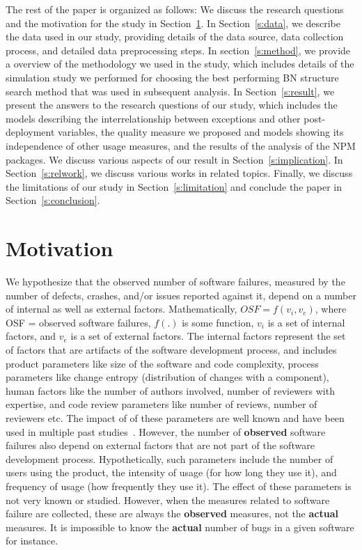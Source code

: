 \documentclass[smallcondensed]{svjour3}     %
\begin{document}
The rest of the paper is organized as follows: We discuss the research questions and the motivation for the study in Section~\ref{s:motiv}. In Section~\ref{s:data}, we describe the data used in our study, providing details of the data source, data collection process, and detailed data preprocessing steps.
In section~\ref{s:method}, we provide a overview of the methodology we used in the study, which includes details of the simulation study we performed for choosing the best performing BN structure search method that was used in subsequent analysis. In Section~\ref{s:result}, we present the answers to the research questions of our study, which includes the models describing the interrelationship between exceptions and other post-deployment variables, the quality measure we proposed and models showing its independence of other usage measures, and the results of the analysis of the NPM packages. We discuss various aspects of our result in Section~\ref{s:implication}. In Section~\ref{s:relwork}, we discuss various works in related topics. Finally, we discuss the limitations of our study in Section~\ref{s:limitation} and conclude the paper in Section~\ref{s:conclusion}.  

\vspace{-10pt}
\section{Motivation}\label{s:motiv}

We hypothesize that the observed number of software failures, measured by the number of defects, crashes, and/or issues reported against it, depend on a number of internal as well as external factors. Mathematically,
$ OSF = f(v_i, v_e) $, where OSF = observed software failures, $f(.)$ is some function, $v_i$ is a set of internal factors, and $v_e$ is a set of external factors. The internal factors represent the set of factors that are artifacts of the software development process, and includes product parameters like size of the software and code complexity, process parameters like change entropy (distribution of changes with a component), human factors like the number of authors involved, number of reviewers with expertise, and code review parameters like number of reviews, number of reviewers etc. The impact of of these parameters are well known and have been used in multiple past studies~\cite{CMRH09,mcintosh2015emse,mcintosh2014impact,rigby2013convergent,kononenko2015investigating}. However, the number of \textbf{observed} software failures also depend on external factors that are not part of the software development process. Hypothetically, such parameters include the number of users using the product, the intensity of usage (for how long they use it), and frequency of usage (how frequently they use it). The effect of these parameters is not very known or studied. However, when the measures related to software failure are collected, these are always the \textbf{observed} measures, not the \textbf{actual} measures. It is impossible to know the \textbf{actual} number of bugs in a given software for instance. 
\end{document}
